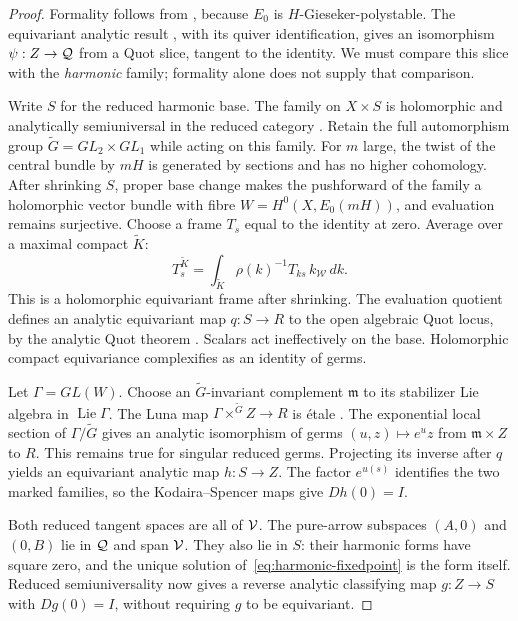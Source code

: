 \begin{proof}
Formality follows from \cite[Theorem~1.2]{BZ19}, because $E_0$ is
$H$-Gieseker-polystable. The equivariant analytic result
\cite[Proposition~4.4]{AS18}, with its quiver identification, gives
an isomorphism $\psi:Z\to\mathcal Q$ from a Quot slice, tangent to the
identity. We must compare this slice with the \emph{harmonic} family;
formality alone does not supply that comparison.

Write $S$ for the reduced harmonic base. The family on $X\times S$
is holomorphic and analytically semiuniversal in the reduced category
\cite[arXiv version, \S5 and Remark~4]{BS21}. Retain the full automorphism group
$\widetilde G=GL_2\times GL_1$ while acting on this family. For $m$
large, the twist of the central bundle by $mH$ is generated by sections
and has no higher cohomology. After shrinking $S$, proper base change
makes the pushforward of the family a holomorphic vector bundle with
fibre $W=H^0(X,E_0(mH))$, and evaluation remains surjective.
Choose a frame $T_s$ equal to the identity at zero. Average over a
maximal compact $\widetilde K$:
\[
T_s^{\widetilde K}
=\int_{\widetilde K}\rho(k)^{-1}T_{ks}\,k_{\mathcal W}\,dk .
\]
This is a holomorphic equivariant frame after shrinking. The evaluation
quotient defines an analytic equivariant map $q:S\to R$ to the
open algebraic Quot locus, by the analytic Quot theorem
\cite[Th\'eor\`eme~1.1]{Gro61}. Scalars act ineffectively on the base.
Holomorphic compact equivariance complexifies as an identity of germs.

Let $\Gamma=GL(W)$. Choose an $\widetilde G$-invariant complement
$\mathfrak m$ to its stabilizer Lie algebra in $\operatorname{Lie}\Gamma$.
The Luna map $\Gamma\times^{\widetilde G}Z\to R$ is \'etale
\cite[\S III.1]{Lun73}. The exponential local section of
$\Gamma/\widetilde G$ gives an analytic isomorphism of germs
$(u,z)\mapsto e^u z$ from $\mathfrak m\times Z$ to $R$.
This remains true for singular reduced germs. Projecting its inverse
after $q$ yields an equivariant analytic map $h:S\to Z$.
The factor $e^{u(s)}$ identifies the two marked families, so the
Kodaira--Spencer maps give $Dh(0)=I$.

Both reduced tangent spaces are all of $\mathcal V$. The pure-arrow subspaces
$(A,0)$ and $(0,B)$ lie in $\mathcal Q$ and span $\mathcal V$. They also lie in
$S$: their harmonic forms have square zero, and the unique solution
of~\eqref{eq:harmonic-fixedpoint} is the form itself. Reduced
semiuniversality now gives a reverse analytic classifying map
$g:Z\to S$ with $Dg(0)=I$, without requiring $g$ to be equivariant.


\end{proof}
